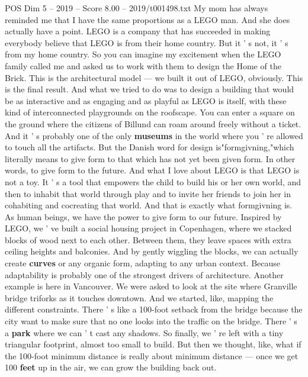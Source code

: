\begin{textsample}{POS Dim 5 – 2019 – Score 8.00 – 2019/t001498.txt}  \label{ex:f5_pos_076}
My mom has always reminded me that I have the same proportions as a LEGO man.
And she does actually have a point.
LEGO is a company that has succeeded in making everybody believe that LEGO is from their home country.
But it ' s not, it ' s from my home country.
So you can imagine my excitement when the LEGO family called me and asked us to work with them to design the Home of the Brick.
This is the architectural model — we built it out of LEGO, obviously.
This is the final result.
And what we tried to do was to design a building that would be as interactive and as engaging and as playful as LEGO is itself, with these kind of interconnected playgrounds on the roofscape.
You can enter a square on the ground where the citizens of Billund can roam around freely without a ticket.
And it ' s probably one of the only \textbf{museums} in the world where you ' re allowed to touch all the artifacts.
But the Danish word for design is"formgivning,"which literally means to give form to that which has not yet been given form.
In other words, to give form to the future.
And what I love about LEGO is that LEGO is not a toy.
It ' s a tool that empowers the child to build his or her own world, and then to inhabit that world through play and to invite her friends to join her in cohabiting and cocreating that world.
And that is exactly what formgivning is.
As human beings, we have the power to give form to our future.
Inspired by LEGO, we ' ve built a social housing project in Copenhagen, where we stacked blocks of wood next to each other.
Between them, they leave spaces with extra ceiling heights and balconies.
And by gently wiggling the blocks, we can actually create \textbf{curves} or any organic form, adapting to any urban context.
Because adaptability is probably one of the strongest drivers of architecture.
Another example is here in Vancouver.
We were asked to look at the site where Granville bridge triforks as it touches downtown.
And we started, like, mapping the different constraints.
There ' s like a 100-foot setback from the bridge because the city want to make sure that no one looks into the traffic on the bridge.
There ' s a \textbf{park} where we can ' t cast any shadows.
So finally, we ' re left with a tiny triangular footprint, almost too small to build.
But then we thought, like, what if the 100-foot minimum distance is really about minimum distance — once we get 100 \textbf{feet} up in the air, we can grow the building back out.

\end{textsample}
